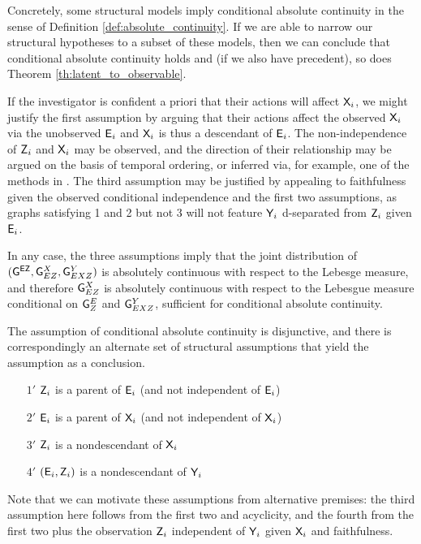 {Concretely, some structural models imply conditional absolute continuity in the sense of Definition \ref{def:absolute_continuity}. If we are able to narrow our structural hypotheses to a subset of these models, then we can conclude that conditional absolute continuity holds and (if we also have precedent), so does Theorem \ref{th:latent_to_observable}.


If the investigator is confident a priori that their actions will affect $\mathsf{X}_i$, we might justify the first assumption by arguing that their actions affect the observed $\mathsf{X}_i$ via the unobserved $\mathsf{E}_i$ and $\mathsf{X}_i$ is thus a descendant of $\mathsf{E}_i$. The non-independence of $\mathsf{Z}_i$ and $\mathsf{X}_i$ may be observed, and the direction of their relationship may be argued on the basis of temporal ordering, or inferred via, for example, one of the methods in \citep{peters_elements_2017}. The third assumption may be justified by appealing to faithfulness given the observed conditional independence and the first two assumptions, as graphs satisfying 1 and 2 but not 3 will not feature $\mathsf{Y}_i$ d-separated from $\mathsf{Z}_i$ given $\mathsf{E}_i$.    

In any case, the three assumptions imply that the joint distribution of $(\mathsf{G}^{\mathsf{EZ}}, \mathsf{G}^{X}_{EZ}, \mathsf{G}^Y_{EXZ})$ is absolutely continuous with respect to the Lebesge measure, and therefore $\mathsf{G}^X_{EZ}$ is absolutely continuous with respect to the Lebesgue measure conditional on $\mathsf{G}^E_Z$ and $\mathsf{G}^Y_{EXZ}$, sufficient for conditional absolute continuity.

The assumption of conditional absolute continuity is disjunctive, and there is correspondingly an alternate set of structural assumptions that yield the assumption as a conclusion.

\begin{itemize}
    \item[$1'$] $\mathsf{Z}_i$ is a parent of $\mathsf{E}_i$ (and not independent of $\mathsf{E}_i$)
    \item[$2'$] $\mathsf{E}_i$ is a parent of $\mathsf{X}_i$ (and not independent of $\mathsf{X}_i$)
    \item[$3'$] $\mathsf{Z}_i$ is a nondescendant of $\mathsf{X}_i$
    \item[$4'$] $(\mathsf{E}_i, \mathsf{Z}_i)$ is a nondescendant of $\mathsf{Y}_i$
\end{itemize}

Note that we can motivate these assumptions from alternative premises: the third assumption here follows from the first two and acyclicity, and the fourth from the first two plus the observation $\mathsf{Z}_i$ independent of $\mathsf{Y}_i$ given $\mathsf{X}_i$ and faithfulness. 

}
